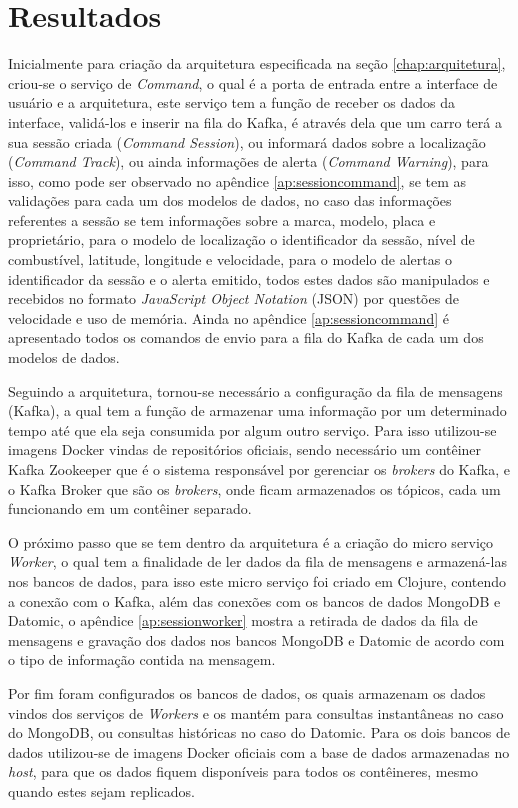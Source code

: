 \chapter{Resultados}
\label{chap:analiseresultados}
Inicialmente para criação da arquitetura especificada na seção \ref{chap:arquitetura}, criou-se o serviço de \textit{Command}, o qual é a porta de entrada entre a interface de usuário e a arquitetura, este serviço tem a função de receber os dados da interface, validá-los e inserir na fila do Kafka, é através dela que um carro terá a sua sessão criada (\textit{Command Session}), ou informará dados sobre a localização (\textit{Command Track}), ou ainda informações de alerta (\textit{Command Warning}), para isso, como pode ser observado no apêndice \ref{ap:sessioncommand}, se tem as validações para cada um dos modelos de dados, no caso das informações referentes a sessão se tem informações sobre a marca, modelo, placa e proprietário, para o modelo de localização o identificador da sessão, nível de combustível, latitude, longitude e velocidade, para o modelo de alertas o identificador da sessão e o alerta emitido, todos estes dados são manipulados e recebidos no formato \textit{JavaScript Object Notation} (JSON) por questões de velocidade e uso de memória. Ainda no apêndice  \ref{ap:sessioncommand} é apresentado todos os comandos de envio para a fila do Kafka de cada um dos modelos de dados.

Seguindo a arquitetura, tornou-se necessário a configuração da fila de mensagens (Kafka), a qual tem a função de armazenar uma informação por um determinado tempo até que ela seja consumida por algum outro serviço. Para isso utilizou-se imagens Docker vindas de repositórios oficiais, sendo necessário um contêiner Kafka Zookeeper que é o sistema responsável por gerenciar os \textit{brokers} do Kafka, e o Kafka Broker que são os \textit{brokers}, onde ficam armazenados os tópicos, cada um funcionando em um contêiner separado.

O próximo passo que se tem dentro da arquitetura é a criação do micro serviço \textit{Worker}, o qual tem a finalidade de ler dados da fila de mensagens e armazená-las nos bancos de dados, para isso este micro serviço foi criado em Clojure, contendo a conexão com o Kafka, além das conexões com os bancos de dados MongoDB e Datomic, o apêndice \ref{ap:sessionworker} mostra a retirada de dados da fila de mensagens e gravação dos dados nos bancos MongoDB e Datomic de acordo com o tipo de informação contida na mensagem.

Por fim foram configurados os bancos de dados, os quais armazenam os dados vindos dos serviços de \textit{Workers} e os mantém para consultas instantâneas no caso do MongoDB, ou consultas históricas no caso do Datomic. Para os dois bancos de dados utilizou-se de imagens Docker oficiais com a base de dados armazenadas no \textit{host}, para que os dados fiquem disponíveis para todos os contêineres, mesmo quando estes sejam replicados.

